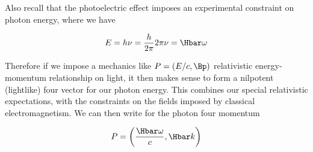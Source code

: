 Also recall that the photoelectric effect imposes an experimental constraint on photon energy, where we have

\begin{equation}\label{eqn:relativisticElectrodynamicsT1:135}
E = h \nu = \frac{h}{2\pi} 2 \pi \nu = \Hbar \omega
\end{equation}

Therefore if we impose a mechanics like $P = (E/c, \Bp)$ relativistic energy-momentum relationship on light, it then makes sense to form a nilpotent (lightlike) four vector for our photon energy.  This combines our special relativistic expectations, with the constraints on the fields imposed by classical electromagnetism.  We can then write for the photon four momentum

\begin{equation}\label{eqn:relativisticElectrodynamicsT1:136}
P = \left( \frac{\Hbar \omega}{c}, \Hbar k \right)
\end{equation}

